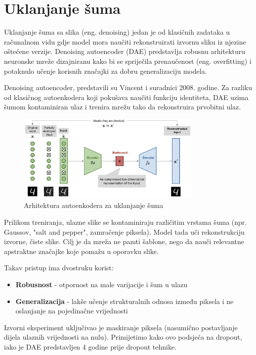 \documentclass[times, utf8, seminar, numeric]{fer}
\begin{document}
		\section{Uklanjanje šuma}
		Uklanjanje šuma sa slika (eng. denoising) jedan je od klasičnih zadataka u računalnom vidu gdje model mora naučiti rekonstruirati izvornu sliku iz njezine oštećene verzije. Denoising autoencoder (DAE) predstavlja robusnu arhitekturu neuronske mreže dizajniranu kako bi se spriječila prenaučenost (eng. overfitting) i potaknulo učenje korisnih značajki za dobru generalizaciju modela.
		
		Denoising autoencoder, predstavili su Vincent i suradnici 2008. godine. Za razliku od klasičnog autoenkodera koji pokušava naučiti funkciju identiteta, DAE uzima šumom kontaminiran ulaz i trenira mrežu tako da rekonstruira prvobitni ulaz. \cite{weng2018VAE}
		
		\begin{figure}[H]
			\centering
			\includegraphics[width=0.8\textwidth]{images/apply/denoising/dae_diagram.png}
			\caption{Arhitektura autoenkodera za uklanjanje šuma \cite{weng2018VAE}}
			\label{fig:dae}
		\end{figure}
		
		Prilikom treniranja, ulazne slike se kontaminiraju različitim vrstama šuma (npr. Gaussov, "salt and pepper", zamračenje piksela). Model tada uči rekonstrukciju izvorne, čiste slike. Cilj je da mreža ne pamti šablone, nego da nauči relevantne apstraktne značajke koje pomažu u oporavku slike.
		
		Takav pristup ima dvostruku korist:
		\begin{itemize}
			\item \textbf{Robusnost} - otpornost na male varijacije i šum u ulazu
			\item \textbf{Generalizacija} - lakše učenje strukturalnih odnosa između piksela i ne oslanjanje na pojedinačne vrijednosti
		\end{itemize}
		
		Izvorni eksperiment uključivao je maskiranje piksela (nasumično postavljanje dijela ulaznih vrijednosti na nulu). Primijetimo kako ovo podsjeća na dropout, iako je DAE predstavljen 4 godine prije dropout tehnike. \cite{weng2018VAE}
		
\end{document}
